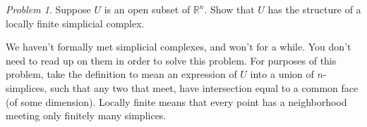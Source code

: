 \documentclass{amsart}
\theoremstyle{remark}
\newtheorem{exercise}{Problem}
\def\R{\mathbb{R}}
\def\sset{\subseteq}
\begin{document}

\begin{exercise}
    Suppose $U$ is an open subset of $\R^n$.  Show that $U$ has the structure
    of a locally finite simplicial complex.  

    We haven't formally met simplicial complexes, and
    won't for a while.  You don't need to read up on them in order to solve this problem.
    For purposes of this problem, take the definition to mean
    an expression of $U$ into a union of $n$-simplices, such that any two that meet, have
    intersection equal to a common face (of some dimension).  Locally finite means that
    every point has a neighborhood meeting only finitely many simplices.
\end{exercise}
\end{document}
